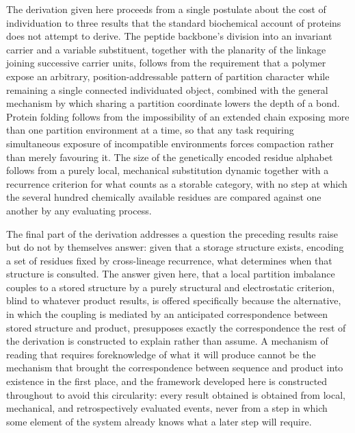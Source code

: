 \documentclass[11pt,twocolumn,a4paper]{article}
\theoremstyle{plain}
\theoremstyle{definition}
\theoremstyle{remark}
\begin{document}
The derivation given here proceeds from a single postulate about the cost
of individuation to three results that the standard biochemical account of
proteins does not attempt to derive. The peptide backbone's division into
an invariant carrier and a variable substituent, together with the
planarity of the linkage joining successive carrier units, follows from the
requirement that a polymer expose an arbitrary, position-addressable
pattern of partition character while remaining a single connected
individuated object, combined with the general mechanism by which sharing a
partition coordinate lowers the depth of a bond. Protein folding follows
from the impossibility of an extended chain exposing more than one
partition environment at a time, so that any task requiring simultaneous
exposure of incompatible environments forces compaction rather than merely
favouring it. The size of the genetically encoded residue alphabet follows
from a purely local, mechanical substitution dynamic together with a
recurrence criterion for what counts as a storable category, with no step
at which the several hundred chemically available residues are compared
against one another by any evaluating process.

The final part of the derivation addresses a question the preceding results
raise but do not by themselves answer: given that a storage structure
exists, encoding a set of residues fixed by cross-lineage recurrence, what
determines when that structure is consulted. The answer given here, that a
local partition imbalance couples to a stored structure by a purely
structural and electrostatic criterion, blind to whatever product results,
is offered specifically because the alternative, in which the coupling is
mediated by an anticipated correspondence between stored structure and
product, presupposes exactly the correspondence the rest of the derivation
is constructed to explain rather than assume. A mechanism of reading that
requires foreknowledge of what it will produce cannot be the mechanism that
brought the correspondence between sequence and product into existence in
the first place, and the framework developed here is constructed throughout
to avoid this circularity: every result obtained is obtained from local,
mechanical, and retrospectively evaluated events, never from a step in
which some element of the system already knows what a later step will
require.
\end{document}
